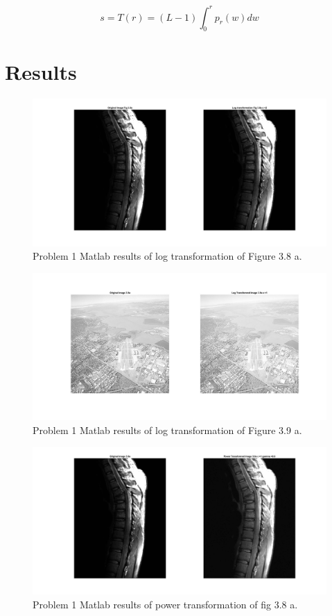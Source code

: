 \documentclass[./rarnold_report2.tex]{subfiles}
\begin{document}
\begin{equation}
\label{hist_eq}
s = T(r) = \left(L-1 \right) \int_{0}^{r} p_{r}(w)dw
\end{equation}

\clearpage

\section*{Results}
  	
  	\begin{figure}[!htbp]
	\centering
	\includegraphics[scale=0.25]{"log_spine"}
	\caption{Problem 1 Matlab results of log transformation of Figure 3.8 a.} 
	\label{log_spine}
	\end{figure}
	
	\begin{figure}[!htbp]
	\centering
	\includegraphics[scale=0.25]{"log_city"}
	\caption{Problem 1 Matlab results of log transformation of Figure 3.9 a.} 
	\label{log_city}
	\end{figure}
  
  	\begin{figure}[!htbp]
	\centering
	\includegraphics[scale=0.25]{"power_spine"}
	\caption{Problem 1 Matlab results of power transformation of fig 3.8 a.} 
	\label{power_spine}
	\end{figure}
	
\end{document}

